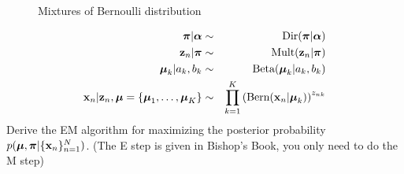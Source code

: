 \documentclass{amsmlaj}
\begin{document}
\begin{problem}
\begin{figure}[H]
\begin{center}
\caption{Mixtures of Bernoulli distribution}
\label{fig:mixbern}
\end{center}
\end{figure}
\begin{eqnarray}
\bm{\mathbf{\pi}}|\bm{\mathbf{\alpha}} & \sim & \text{Dir}(\bm{\mathbf{\pi}}|\bm{\mathbf{\alpha}}) \nonumber\\
\bm{\mathbf{z}}_n | \bm{\mathbf{\pi}} & \sim & \text{Mult}(\bm{\mathbf{z}}_n | \bm{\mathbf{\pi}}) \nonumber\\
\bm{\mathbf{\mu}}_k|a_k, b_k & \sim & \text{Beta}(\bm{\mathbf{\mu}}_k|a_k, b_k) \nonumber\\
\bm{\mathbf{x}}_n|\bm{\mathbf{z}}_n, \bm{\mathbf{\mu}}=\{\bm{\mathbf{\mu}}_1, \dotsc, \bm{\mathbf{\mu}}_K\} & \sim & \prod\limits_{k=1}^K\left(\text{Bern}(\bm{\mathbf{x}}_n|\bm{\mathbf{\mu}}_k)\right)^{z_{nk}} \nonumber
\end{eqnarray}
Derive the EM algorithm for maximizing the posterior probability $p(\bm{\mathbf{\mu}},\bm{\mathbf{\pi}}|\{ \bm{\mathbf{x}}_n\}_{n=1}^N)$. (The E step is given in Bishop's Book, you only need to do the M step)


\end{problem}
\end{document}
